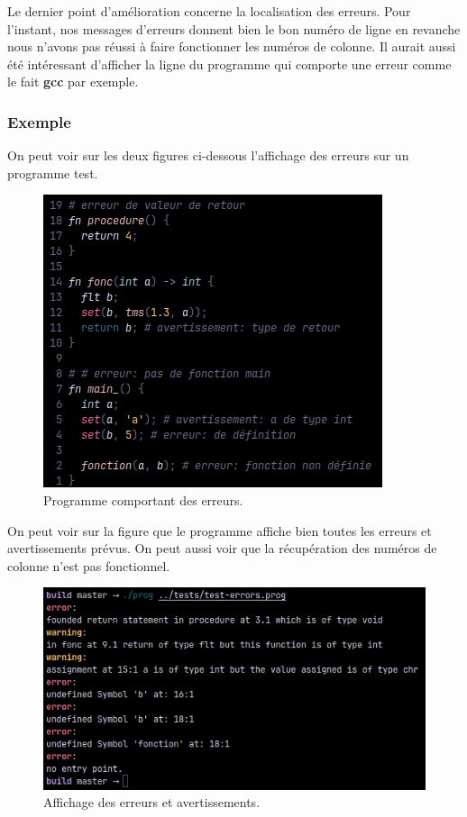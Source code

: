 \documentclass[a4paper]{article}%
\begin{document}
Le dernier point d'amélioration concerne la localisation des erreurs. Pour
l'instant, nos messages d'erreurs donnent bien le bon numéro de ligne en
revanche nous n'avons pas réussi à faire fonctionner les numéros de colonne. Il
aurait aussi été intéressant d'afficher la ligne du programme qui comporte une
erreur comme le fait \textbf{gcc} par exemple.\\

\subsubsection*{Exemple}

On peut voir sur les deux figures ci-dessous l'affichage des erreurs sur un
programme test.

\begin{figure}[h]
  \begin{center}
  \includegraphics[scale=0.7]{./img/err-prog.png}
  \caption{Programme comportant des erreurs.}
  \end{center}
\end{figure}

\clearpage
On peut voir sur la figure que le programme affiche bien toutes les erreurs et
avertissements prévus. On peut aussi voir que la récupération des numéros de
colonne n'est pas fonctionnel.

\begin{figure}[h]
  \begin{center}
  \includegraphics[scale=0.7]{./img/err-prog-out.png}
  \caption{Affichage des erreurs et avertissements.}
  \end{center}
\end{figure}
\end{document}
